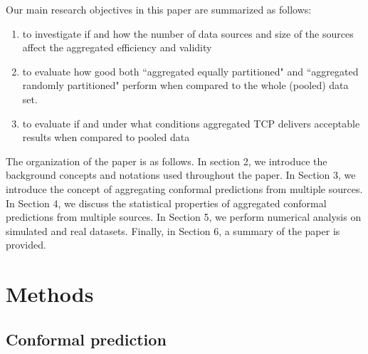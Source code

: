 \documentclass[preprint,12pt,authoryear]{elsarticle}
\begin{document}

Our main research objectives in this paper are summarized as follows:

\begin{enumerate}
\item to investigate if and how the number of data sources and size of the sources affect the aggregated efficiency and validity

\item to evaluate how good both ``aggregated equally partitioned" and ``aggregated randomly partitioned" perform when compared to the whole (pooled) data set.

\item to evaluate if and under what conditions aggregated TCP delivers acceptable results when compared to pooled data



\end{enumerate}

The organization of the paper is as follows. In section 2, we introduce the background concepts and notations used throughout the paper. In Section 3, we introduce the concept of aggregating conformal predictions from multiple sources. In Section 4, we discuss the statistical properties of aggregated conformal predictions from multiple sources. In Section 5, we perform numerical analysis on simulated and real datasets. Finally, in Section 6, a summary of the paper is provided.


\section{Methods}

\subsection{Conformal prediction}
\end{document}
